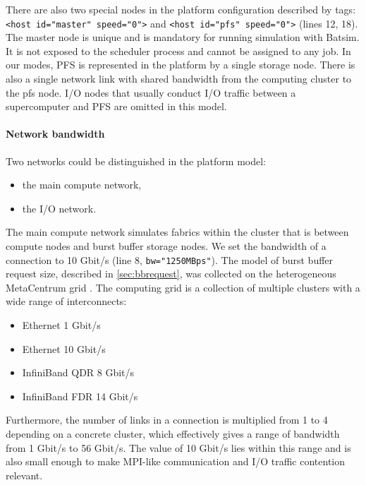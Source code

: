 \documentclass[thesis-en.tex]{subfiles}
\begin{document}
There are also two special nodes in the platform configuration described by tags:\\ \verb|<host id="master" speed="0">| and \verb|<host id="pfs" speed="0">| (lines 12, 18). The master node is unique and is mandatory for running simulation with Batsim. It is not exposed to the scheduler process and cannot be assigned to any job. In our modes, PFS is represented in the platform by a single storage node. There is also a single network link with shared bandwidth from the computing cluster to the pfs node. I/O nodes that usually conduct I/O traffic between a supercomputer and PFS are omitted in this model.

\paragraph{Network bandwidth}
Two networks could be distinguished in the platform model:
\begin{itemize}
    \item the main compute network,
    \item the I/O network.
\end{itemize}
The main compute network simulates fabrics within the cluster that is between compute nodes and burst buffer storage nodes. We set the bandwidth of a connection to 10 Gbit/s (line 8, \verb|bw="1250MBps"|). The model of burst buffer request size, described in \autoref{sec:bbrequest}, was collected on the heterogeneous MetaCentrum grid \cite{metacentrum}. The computing grid is a collection of multiple clusters with a wide range of interconnects:
\begin{itemize}
    \item Ethernet 1 Gbit/s
    \item Ethernet 10 Gbit/s
    \item InfiniBand QDR 8 Gbit/s	
    \item InfiniBand FDR 14 Gbit/s
\end{itemize}
Furthermore, the number of links in a connection is multiplied from 1 to 4 depending on a concrete cluster, which effectively gives a range of bandwidth from 1 Gbit/s to 56 Gbit/s. The value of 10 Gbit/s lies within this range and is also small enough to make MPI-like communication and I/O traffic contention relevant.
\end{document}

